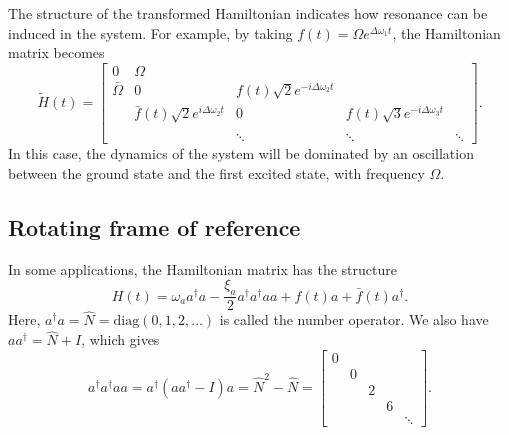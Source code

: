 \documentclass[11pt]{article}
\begin{document}
The structure of the transformed Hamiltonian indicates how resonance can be induced in the
system. For example, by taking $f(t)=\Omega e^{\Delta \omega_1 t}$, the Hamiltonian matrix
becomes
\[
\tilde{H}(t) = \begin{bmatrix}
0 & \Omega & & &\\
\bar{\Omega} & 0 & f(t) \sqrt{2} e^{-i\Delta \omega_2 t}& &\\
& \bar{f}(t) \sqrt{2} e^{i\Delta \omega_2 t} & 0 & f(t) \sqrt{3} e^{-i\Delta \omega_3 t}
&\\
\\
& & \ddots & \ddots & \ddots
\end{bmatrix}.
\]
In this case, the dynamics of the system will be dominated by an oscillation between the ground state and the
first excited state, with frequency $\Omega$.

\subsection{Rotating frame of reference}

In some applications, the Hamiltonian matrix has the structure
\begin{equation}\label{eq_orig_hamiltonian}
H(t) = \omega_a a^\dag a - \frac{\xi_a}{2} a^\dag a^\dag a a + f(t) a + \bar{f}(t) a^\dag.
\end{equation}
Here, $a^\dag a = \hat{N}=\mbox{diag$(0,1,2,\ldots)$}$ is called the number operator. We also have
$a a^\dag = \hat{N}+I$, which gives
\[
a^\dag a^\dag a a = a^\dag (a a^\dag - I) a = \hat{N}^2 - \hat{N} =
%
\begin{bmatrix}
  0 & & & & \\
  & 0 & & & \\
  && 2 && \\
  &&& 6 & \\
  &&&& \ddots
\end{bmatrix}.
\]
\end{document}
